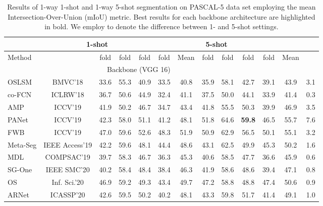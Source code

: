\documentclass[runningheads]{llncs}
\begin{document}
\begin{table*}[h!]
\vspace{-0mm}
\scriptsize
\centering
\begin{center}
\caption{Results of 1-way 1-shot and 1-way 5-shot segmentation on PASCAL-5 data set employing the mean Intersection-Over-Union (mIoU) metric. Best results for each backbone architecture are highlighted in bold. We employ  to denote the difference between 1- and 5-shot settings.}
\label{table:headings}
\begin{tabular}{l|cccccc|ccccc|c}
\toprule
\noalign{\smallskip}
& \multicolumn{4}{c}{1-shot} & &\multicolumn{4}{c}{5-shot} & \\
\midrule
Method & & fold & fold & fold & fold & Mean & fold & fold & fold & fold & Mean & \\
\noalign{\smallskip}
\midrule
   & \multicolumn{8}{c}{Backbone (VGG 16)}       \\
 \midrule
\noalign{\smallskip}

OSLSM \cite{shaban2017one} & BMVC'18 &33.6 & 55.3 & 40.9 & 33.5 & 40.8 & 35.9 & 58.1 & 42.7 & 39.1& 43.9 & 3.1\\
co-FCN \cite{rakelly2018conditional} & ICLRW'18 &36.7 & 50.6 & 44.9 & 32.4 & 41.1 & 37.5 & 50.0 & 44.1 & 33.9 & 41.4 & 0.3 \\

AMP \cite{siam2019amp} & ICCV'19 &41.9 & 50.2 & 46.7 & 34.7 & 43.4 & 41.8 & 55.5 & 50.3 & 39.9 & 46.9 & 3.5  \\
PANet \cite{wang2019panet} & ICCV'19 &42.3 & 58.0 & 51.1 & 41.2 & 48.1 & 51.8 & 64.6 & \textbf{59.8} & 46.5 & 55.7 & 7.6 \\
FWB\cite{nguyen2019feature} & ICCV'19 &47.0 & 59.6 & 52.6 & 48.3 & 51.9 & 50.9 & 62.9 & 56.5 & 50.1 & 55.1 & 3.2 \\
Meta-Seg \cite{cao2019meta} & IEEE Access'19&42.2 & 59.6 & 48.1 & 44.4 & 48.6 & 43.1 & 62.5 & 49.9 & 45.3 & 50.2 & 1.6  \\
MDL \cite{dong2019multi} & COMPSAC'19 &39.7 & 58.3 & 46.7 & 36.3 & 45.3 & 40.6 & 58.5 & 47.7 & 36.6 & 45.9 & 0.6  \\
SG-One \cite{zhang2018sg}& IEEE SMC'20 &40.2 & 58.4 & 48.4 & 38.4 & 46.3 & 41.9 & 58.6 & 48.6 & 39.4 & 47.1 & 0.8 \\
OS \cite{yang2020recognizing} & Inf. Sci.'20 &46.9 & 59.2 & 49.3 & 43.4 & 49.7 & 47.2 & 58.8 & 48.8 & 47.4 & 50.6 & 0.9  \\
ARNet \cite{li2020arnet} & ICASSP'20 & 42.6 & 59.5 & 50.2 & 40.2 & 48.1 & 43.3 & 59.8 & 51.7 & 41.4 & 49.1 & 1.0 \\


\end{tabular}
\end{center}
\end{table*}
\end{document}
